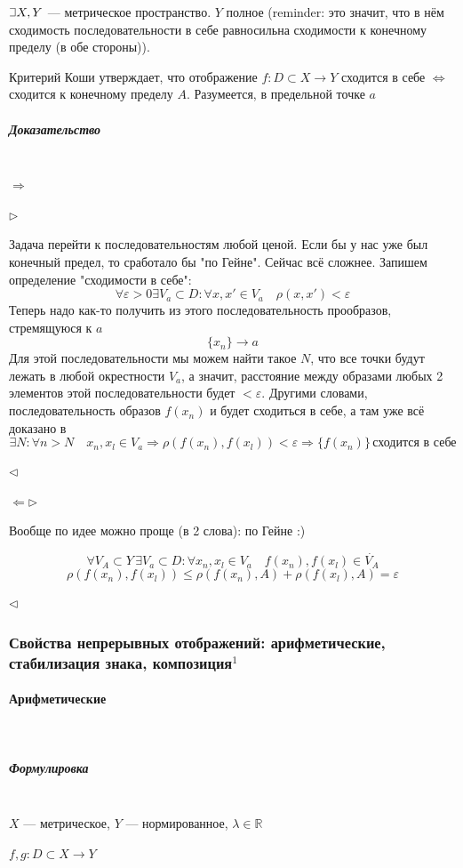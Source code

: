 \documentclass{article}
\def\letus{%
\mathord{\setbox0=\hbox{$\exists$}%
         \hbox{\kern 0.125\wd0%
               \vbox to \ht0{%
                  \hrule width 0.75\wd0%
                  \vfill%
                  \hrule width 0.75\wd0}%
               \vrule height \ht0%
               \kern 0.125\wd0}%
       }%
        }
\let\vanillaparagraph\paragraph
\let\vanillasubparagraph\subparagraph
\renewcommand{\paragraph}[1]{\vanillaparagraph{#1}\mbox{}\\}
\renewcommand{\subparagraph}[1]{\vanillasubparagraph{#1}\mbox{}\\}
\begin{document}
$\letus X, Y$ --- метрическое пространство. $Y$ полное (reminder: это значит, что в нём сходимость последовательности в себе равносильна сходимости к конечному пределу (в обе стороны)).

Критерий Коши утверждает, что отображение $f: D \subset X \rightarrow Y$ сходится в себе $\Leftrightarrow$ сходится к конечному пределу $A$. Разумеется, в предельной точке $a$

\subparagraph{Доказательство}
$\Rightarrow$

$\rhd$

Задача перейти к последовательностям любой ценой. Если бы у нас уже был конечный предел, то сработало бы "по Гейне". Сейчас всё сложнее. Запишем определение "сходимости в себе":
$$
\forall \varepsilon > 0 \exists V_a \subset D : \forall x, x' \in V_a \quad \rho(x, x') < \varepsilon
$$
Теперь надо как-то получить из этого последовательность прообразов, стремящуюся к $a$
$$
\{x_n\} \rightarrow a
$$
Для этой последовательности мы можем найти такое $N$, что все точки будут лежать в любой окрестности $V_a$, а значит, расстояние между образами любых 2 элементов этой последовательности будет $< \varepsilon$. Другими словами, последовательность образов $f(x_n)$ и будет сходиться в себе, а там уже всё доказано в 
$$
\exists N : \forall n > N \quad x_n, x_l \in V_a \Rightarrow \rho(f(x_n), f(x_l)) < \varepsilon \Rightarrow \{f(x_n)\} \, \text{сходится в себе}
$$

$\lhd$

$\Leftarrow \rhd$

Вообще по идее можно проще (в 2 слова): по Гейне :)

$$
\forall V_A \subset Y \, \exists V_a \subset D : \forall x_n, x_l \in V_a \quad f(x_n), f(x_l) \in \dot{V_A}
$$
$$
\rho(f(x_n), f(x_l)) \le \rho(f(x_n), A) + \rho(f(x_l), A) = \varepsilon
$$

$\lhd$


\subsubsection{Свойства непрерывных отображений: арифметические, стабилизация знака, композиция\texorpdfstring{$^1$}{}}
\paragraph{Арифметические}
\subparagraph{Формулировка}
$X$ --- метрическое, $Y$ --- нормированное, $\lambda \in \mathbb{R}$

$f, g: D \subset X \rightarrow Y$
\end{document}
